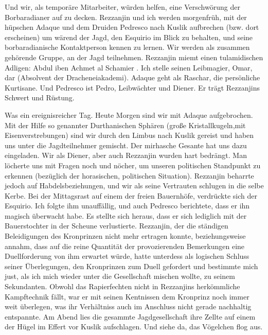 Und wir, als temporäre Mitarbeiter, würden helfen, eine Verschwörung der Borbaradianer auf zu decken. Rezzanjin und ich werden morgenfrüh, mit der hüpschen Adaque und dem Druiden Pedresco nach Kuslik aufbrechen (bzw. dort erscheinen) um wärend der Jagd, den Esquirio im Blick zu behalten, und seine borbaradianische Kontaktperson kennen zu lernen. Wir werden als zusammen gehörende Gruppe, an der Jagd teilnehmen. Rezzanjin miemt einen tulamidischen Adligen: Abdul iben Achmet al Schamier . Ich stelle seinen Leibmagier, Omar, dar (Absolvent der Dracheneiakademi). Adaque geht als Raschar, die persönliche Kurtisane. Und Pedresco ist Pedro, Leibwächter und Diener. Er trägt Rezzanjins Schwert und Rüstung.


Was ein ereignisreicher Tag. Heute Morgen sind wir mit Adaque aufgebrochen. Mit der Hilfe so genannter Durthanischen Sphären (große Kristallkugeln,mit Eisenverstrebungen) sind wir durch den Limbus nach Kuslik gereist und haben uns unter die Jagdteilnehmer gemischt. Der mirhasche Gesante hat uns dazu eingeladen. Wir als Diener, aber auch Rezzanjin wurden hart bedrängt. Man löcherte uns mit Fragen noch und nöcher, um unseren politischen Standpunkt zu erkennen (bezüglich der horasischen, politischen Situation). Rezzanjin beharrte jedoch auf Habdelsbeziehungen, und wir als seine Vertrauten schlugen in die selbe Kerbe. Bei der Mittagsrast auf einem der freien Bauernhöfe, verdrückte sich der Esquirio. Ich folgte ihm unauffällig, und auch Pedresco berichtete, dass er ihn magisch überwacht habe. Es stellte sich heraus, dass er sich lediglich mit der Bauerstochter in der Scheune verlustierte. Rezzanjin, der die ständigen Beleidigungen des Kronprinzen nicht mehr ertragen konnte, beziehungsweise annahm, dass auf die reine Quantität der provozierenden Bemerkungen eine Duellforderung von ihm erwartet würde, hatte unterdess als logischen Schluss seiner Überlegungen, den Kronprinzen zum Duell gefordert und bestimmte mich just, als ich mich wieder unter die Gesellschaft mischen wollte, zu seinem Sekundanten. Obwohl das Rapierfechten nicht in Rezzanjins herkömmliche Kampftechnik fällt, war er mit seinen Kentnissen dem Kronprinz noch immer weit überlegen, was ihr Verhältniss auch im Anschluss nicht gerade nachhaltig entspannte. Am Abend lies die gesammte Jagdgesellschaft ihre Zellte auf einem der Hügel im Effert vor Kuslik aufschlagen. Und siehe da, das Vögelchen flog aus.

